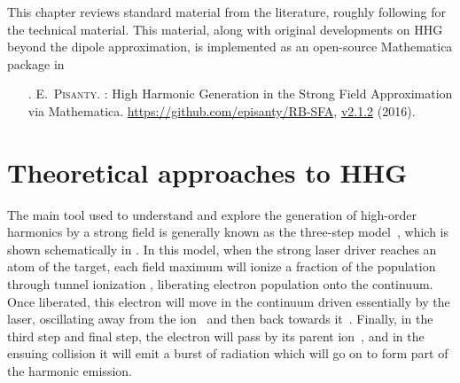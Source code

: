 This chapter reviews standard material from the literature, roughly following  for the technical material. This material, along with original developments on HHG beyond the dipole approximation, is implemented as an open-source Mathematica package in
\begin{enumerate}
\item[{\hypersetup{citecolor=black}\citealp{RB-SFA}}.]
\textsc{E.~Pisanty}.
: {H}igh {H}armonic {G}eneration in the {S}trong {F}ield
  {A}pproximation via {M}athematica.
\newblock \url{https://github.com/episanty/RB-SFA}, \href{http://dx.doi.org/10.5281/zenodo.164626}{v2.1.2} (2016).
\end{enumerate}







\section{Theoretical approaches to HHG}
\label{sec:hhg-intro-intro}


The main tool used to understand and explore the generation of high-order harmonics by a strong field is generally known as the three-step model~\cite{corkum_plasma-perspective_1993, LewensteinHHG}, which is shown schematically in . In this model, when the strong laser driver reaches an atom of the target, each field maximum will ionize a fraction of the population through tunnel ionization , liberating electron population onto the continuum. Once liberated, this electron will move in the continuum driven essentially by the laser, oscillating away from the ion~ and then back towards it~. Finally, in the third step and final step, the electron will pass by its parent ion~, and in the ensuing collision it will emit a burst of radiation which will go on to form part of the harmonic emission.





